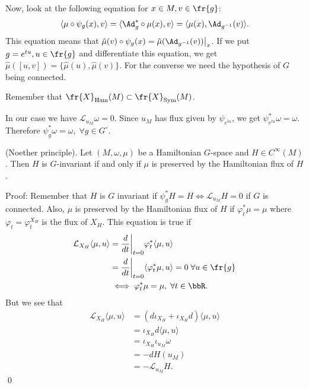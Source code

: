 Now, look at the following equation for $x\in M, v\in \fr{g}$:
\begin{equation}
    \langle \mu\circ\psi_g(x),v\rangle = \langle\Ad_g^*\circ\mu(x),v\rangle = \langle \mu(x), \Ad_{g^{-1}}(v)\rangle.
\end{equation}
This equation means that $\hat{\mu}(v)\circ\psi_g(x)=\hat{\mu}(\Ad_{g^{-1}}(v))\big|_x$. If we put $g=e^{tu},u\in\fr{g}$ and 
differentiate this equation, we get $\hat{\mu}([u,v])=\{\hat{\mu}(u),\hat{\mu}(v)\}$. For the converse we need the hypothesis 
of $G$ being connected.\par 

\begin{remark}
    Remember that $\fr{X}_{\text{Ham}}(M)\subset\fr{X}_{\text{Sym}}(M)$. 
\end{remark}

In our case we have $\mathcal{L}_{u_M}\omega = 0$. Since $u_M$ has flux given by $\psi_{e^{tu}}$, we get 
$\psi_{e^{tu}}^*\omega=\omega$. Therefore $\psi_g^*\omega = \omega,\;\forall g\in G^\circ$.
    
\begin{dang}
    \begin{theorem}
        (Noether principle). Let $(M,\omega,\mu)$ be a Hamiltonian $G$-space and $H\in C^\infty(M)$. Then 
        $H$ is $G$-invariant if and only if $\mu$ is preserved by the Hamiltonian flux of $H$.
    \end{theorem}
\end{dang}
Proof: Remember that $H$ is $G$ invariant if $\psi_g^*H=H\iff\mathcal{L}_{u_M}H=0$ if $G$ is connected. Also, 
$\mu$ is preserved by the Hamiltonian flux of $H$ if $\varphi_t^*\mu=\mu$ where $\varphi_t=\varphi_t^{X_H}$ is the 
flux of $X_H$. This equation is true if 
\begin{equation}
    \begin{split}
        \mathcal{L}_{X_H}\langle\mu,u\rangle &= \frac{d}{dt}\bigg|_{t=0}\varphi_t^*\langle\mu,u\rangle\\
           &=\frac{d}{dt}\bigg|_{t=0}\langle\varphi_t^*\mu,u\rangle=0\;\forall u\in\fr{g}\\
           &\iff \varphi_t^*\mu =\mu,\;\forall t\in\bbR.
    \end{split}
\end{equation}
But we see that 
\begin{equation}
    \begin{split}
        \mathcal{L}_{X_H}\langle\mu,u\rangle &= (d\iota_{X_H}+\iota_{X_H}d)\langle\mu,u\rangle\\
        &=\iota_{X_H}d\langle\mu,u\rangle\\
        &=\iota_{X_H}\iota_{u_M}\omega\\
        &=-dH(u_M)\\
        &=-\mathcal{L}_{u_M}H.
    \end{split}
\end{equation}
\qed

